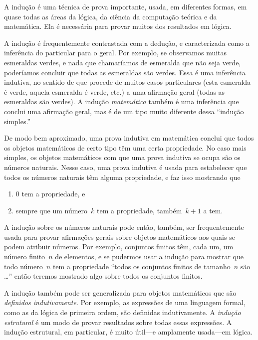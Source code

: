 \documentclass[../../../include/open-logic-section]{subfiles}
\begin{document}


A indução é uma técnica de prova importante, usada, em diferentes
formas, em quase todas as áreas da lógica, da ciência da computação teórica e da
matemática.  Ela é necessária para provar muitos dos resultados em lógica.

A indução é frequentemente contrastada com a dedução, e caracterizada como a
inferência do particular para o geral.  Por exemplo, se
observamos muitas esmeraldas verdes, e nada que chamaríamos de esmeralda
que não seja verde, poderíamos concluir que todas as esmeraldas são verdes. Essa
é uma inferência indutiva, no sentido de que procede de muitos casos
particulares (esta esmeralda é verde, aquela esmeralda é verde, etc.) a uma
afirmação geral (todas as esmeraldas são verdes).  A indução \emph{matemática}
também é uma inferência que conclui uma afirmação geral, mas é de um
tipo muito diferente dessa ``indução simples.''

De modo bem aproximado, uma prova indutiva em matemática conclui que todos os
objetos matemáticos de certo tipo têm uma certa propriedade.  No
caso mais simples, os objetos matemáticos com que uma prova indutiva se
ocupa são os números naturais.  Nesse caso, uma prova indutiva
é usada para estabelecer que todos os números naturais têm alguma propriedade, e
faz isso mostrando que
\begin{enumerate}
    \item $0$ tem a propriedade, e
    \item sempre que um número~$k$ tem a propriedade, também~$k+1$ a tem.
\end{enumerate}
A indução sobre os números naturais pode então, também, ser frequentemente usada para provar
afirmações gerais sobre objetos matemáticos aos quais se podem atribuir números. Por
exemplo, conjuntos finitos têm, cada um, um número finito~$n$ de elementos, e
se pudermos usar a indução para mostrar que todo número~$n$ tem a propriedade
``todos os conjuntos finitos de tamanho~$n$ são \dots'' então teremos mostrado
algo sobre todos os conjuntos finitos.

A indução também pode ser generalizada para objetos matemáticos que são
\emph{definidos indutivamente}.  Por exemplo, as expressões de uma linguagem
formal, como as da lógica de primeira ordem, são definidas indutivamente.
A \emph{indução estrutural} é um modo de provar resultados sobre todas essas
expressões.  A indução estrutural, em particular, é muito
útil---e amplamente usada---em lógica.
\end{document}

